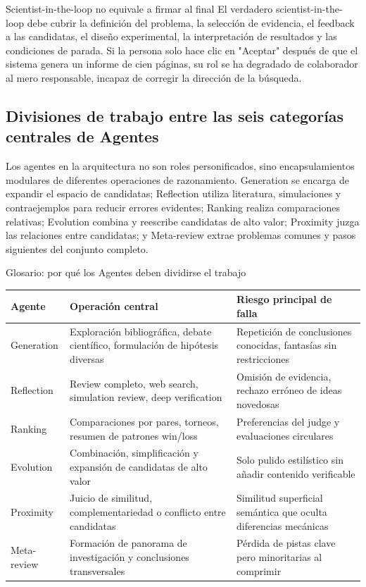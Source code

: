 \begin{importantbox}{Scientist-in-the-loop no equivale a firmar al final}
El verdadero scientist-in-the-loop debe cubrir la definición del problema, la selección de evidencia, el feedback a las candidatas, el diseño experimental, la interpretación de resultados y las condiciones de parada. Si la persona solo hace clic en "Aceptar" después de que el sistema genera un informe de cien páginas, su rol se ha degradado de colaborador al mero responsable, incapaz de corregir la dirección de la búsqueda.
\end{importantbox}

\subsection{Divisiones de trabajo entre las seis categorías centrales de Agentes}

Los agentes en la arquitectura no son roles personificados, sino encapsulamientos modulares de diferentes operaciones de razonamiento. Generation se encarga de expandir el espacio de candidatas; Reflection utiliza literatura, simulaciones y contraejemplos para reducir errores evidentes; Ranking realiza comparaciones relativas; Evolution combina y reescribe candidatas de alto valor; Proximity juzga las relaciones entre candidatas; y Meta-review extrae problemas comunes y pasos siguientes del conjunto completo.

\begin{knowledgebox}{Glosario: por qué los Agentes deben dividirse el trabajo}
\begin{tabular}{L{0.17\textwidth}L{0.33\textwidth}L{0.32\textwidth}}
\toprule
Agente & Operación central & Riesgo principal de falla \\
\midrule
Generation & Exploración bibliográfica, debate científico, formulación de hipótesis diversas & Repetición de conclusiones conocidas, fantasías sin restricciones \\
Reflection & Review completo, web search, simulation review, deep verification & Omisión de evidencia, rechazo erróneo de ideas novedosas \\
Ranking & Comparaciones por pares, torneos, resumen de patrones win/loss & Preferencias del judge y evaluaciones circulares \\
Evolution & Combinación, simplificación y expansión de candidatas de alto valor & Solo pulido estilístico sin añadir contenido verificable \\
Proximity & Juicio de similitud, complementariedad o conflicto entre candidatas & Similitud superficial semántica que oculta diferencias mecánicas \\
Meta-review & Formación de panorama de investigación y conclusiones transversales & Pérdida de pistas clave pero minoritarias al comprimir \\
\bottomrule
\end{tabular}
\end{knowledgebox}

